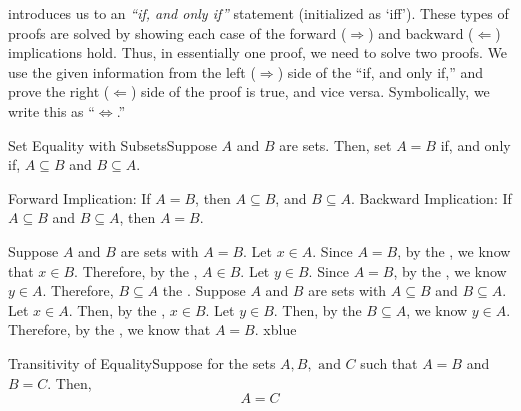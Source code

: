 
 introduces us to an \textit{``if, and only if''} statement (initialized as `iff'). These types of proofs are solved by showing each case of the forward ($\Rightarrow$) and backward ($\Leftarrow$) implications hold. Thus, in essentially one proof, we need to solve two proofs. We use the given information from the left ($\Rightarrow$) side of the ``if, and only if,'' and prove the right ($\Leftarrow$) side of the proof is true, and vice versa. Symbolically, we write this as ``$\iff$.''

\vspace{0.5cm}

\begin{ntheorem}
    {Set Equality with Subsets}Suppose $A$ and $B$ are sets. Then, set $A = B$ if, and only if, $A\subseteq B$ and $B\subseteq A$. 

    Forward Implication: If $A = B$, then $A\subseteq B$, and $B\subseteq A$. 
    Backward Implication: If $A \subseteq B$ and $B\subseteq A$, then $A = B$.
\end{ntheorem}

\iffpf
{Suppose $A$ and $B$ are sets with $A = B$. Let $x\in A$. Since $A = B$, by the , we know that $x\in B$. Therefore, by the , $A\in B$. Let $y\in B$. Since $A = B$, by the , we know $y\in A$. Therefore, $B\subseteq A$ the .}
{Suppose $A$ and $B$ are sets with $A\subseteq B$ and $B\subseteq A$. Let $x\in A$. Then, by the , $x\in B$. Let $y\in B$. Then, by the  $B\subseteq A$, we know $y\in A$.}
{Therefore, by the , we know that $A = B$.}
{xblue}

\newpage

\begin{exercise}
    {Transitivity of Equality}Suppose for the sets $A, B, \text{ and } C$ such that $A = B$ and $B = C$. Then, $$A = C$$
\end{exercise}

